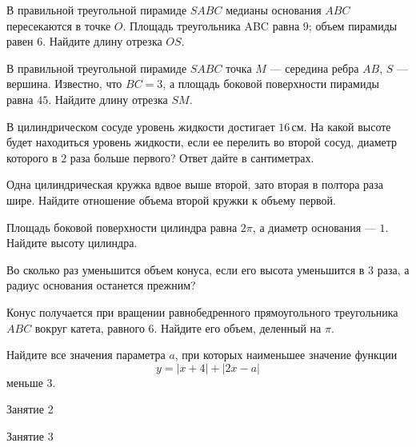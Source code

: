 \begin{class}[number=1]
\begin{listofex}
		\item В правильной треугольной пирамиде \( SABC \) медианы основания \( ABC \) пересекаются в точке \( O \). Площадь треугольника ABC равна \( 9 \); объем пирамиды равен \( 6 \). Найдите длину отрезка \( OS \).
		\item В правильной треугольной пирамиде \( SABC \) точка \( M \) --- середина ребра \( AB \), \( S \) --- вершина.
		Известно, что \( BC = 3 \), а площадь боковой поверхности пирамиды равна \( 45 \). Найдите длину отрезка \( SM \).
		\item В цилиндрическом сосуде уровень жидкости достигает \( 16 \) см. На какой высоте будет находиться уровень жидкости, если ее перелить во второй сосуд, диаметр которого в \( 2 \) раза больше первого? Ответ дайте в сантиметрах.
		\item Одна цилиндрическая кружка вдвое выше второй, зато вторая в полтора раза шире. Найдите отношение объема второй кружки к объему первой.
		\item Площадь боковой поверхности цилиндра равна \( 2 \pi \), а диаметр основания  --- \( 1 \). Найдите высоту цилиндра.
		\item Во сколько раз уменьшится объем конуса, если его высота уменьшится в \( 3 \) раза, а радиус основания останется прежним?
		\item Конус получается при вращении равнобедренного прямоугольного треугольника \( ABC \) вокруг катета, равного \( 6 \). Найдите его объем, деленный на \( \pi \).
		\item Найдите все значения параметра \( a \), при которых наименьшее значение функции
		\[ y=|x+4|+|2x-a| \]
		меньше \( 3 \).
	\end{listofex}
\end{class}

\begin{class}[number=2]
	\begin{listofex}
		\item Занятие 2
	\end{listofex}
\end{class}

\begin{class}[number=3]
	\begin{listofex}
		\item Занятие 3
	\end{listofex}
\end{class}

